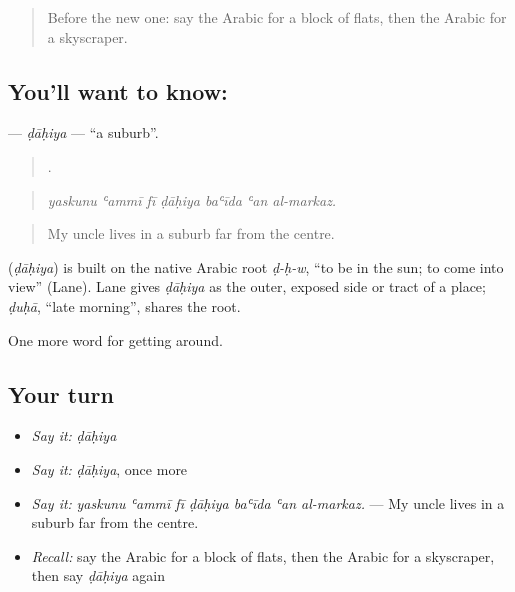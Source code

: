 \label{lesson:AR-C454-dahiya}



\begin{quote}
Before the new one: say the Arabic for a block of flats, then the Arabic for a skyscraper.
\end{quote}

\subsection*{You'll want to know: }
\textbf{} — \emph{ḍāḥiya} — \textquotedblleft{}a suburb\textquotedblright{}.

\begin{quote}
      .
\end{quote}

\begin{quote}
\emph{yaskunu ʿammī fī ḍāḥiya baʿīda ʿan al-markaz.}
\end{quote}

\begin{quote}
My uncle lives in a suburb far from the centre.
\end{quote}

\begin{cousinweb}
\textbf{} (\emph{ḍāḥiya}) is built on the native Arabic root \emph{ḍ-ḥ-w}, \textquotedblleft{}to be in the sun; to come into view\textquotedblright{} (Lane). Lane gives \emph{ḍāḥiya} as the outer, exposed side or tract of a place; \emph{ḍuḥā}, \textquotedblleft{}late morning\textquotedblright{}, shares the root.
\end{cousinweb}

\begin{grammarlens}[title={What you've built}]
One more word for getting around.
\end{grammarlens}

\subsection*{Your turn}
\begin{itemize}
\raggedright
  \item \emph{Say it:} \emph{ḍāḥiya}
  \item \emph{Say it:} \emph{ḍāḥiya}, once more
  \item \emph{Say it:} \emph{yaskunu ʿammī fī ḍāḥiya baʿīda ʿan al-markaz.} — My uncle lives in a suburb far from the centre.
  \item \emph{Recall:} say the Arabic for a block of flats, then the Arabic for a skyscraper, then say \emph{ḍāḥiya} again
\end{itemize}

